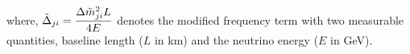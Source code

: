 where, $\Tilde{\Delta}_{ji} = \dfrac{\Delta\Tilde{m}^2_{ji}L}{4E}$ denotes the modified frequency term with two measurable quantities, baseline length ($L$ in km) and the neutrino energy ($E$ in GeV).
























